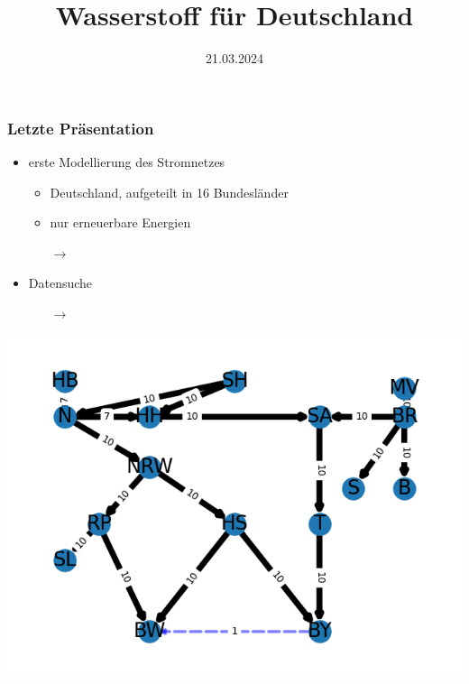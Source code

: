 \documentclass[aspectratio=169,t]{beamer}
\title{Wasserstoff für Deutschland}
\subtitle{}
\date{21.03.2024}
\author{}
\begin{document}
	
	\maketitle
	
	
	

	
	\begin{frame}
		\frametitle{Letzte Präsentation}
		\vspace*{2mm}
		\begin{minipage}{1\linewidth}
			\begin{minipage}{.5\linewidth}
				
			
				
		\begin{itemize}
			\item erste Modellierung des Stromnetzes
			
			\begin{itemize}
				\item Deutschland, aufgeteilt in 16 Bundesländer 
				
				\item nur erneuerbare Energien
			\end{itemize}
			\vspace*{2mm}
			
			\begin{itemize}
				\item [$\rightarrow$]
			\end{itemize}
		\vspace*{2mm}
		
		\item Datensuche 
		\vspace*{2mm}
		
		\begin{itemize}
			\item [$\rightarrow$]
		\end{itemize}
				 
		\end{itemize}
	\end{minipage}
\hfill
\begin{minipage}{.6\linewidth}
\centering
\includegraphics[width=.7\linewidth]{old_graph.png}

\end{minipage}
\end{minipage}	
		
			
		
	\end{frame}
\end{document}

